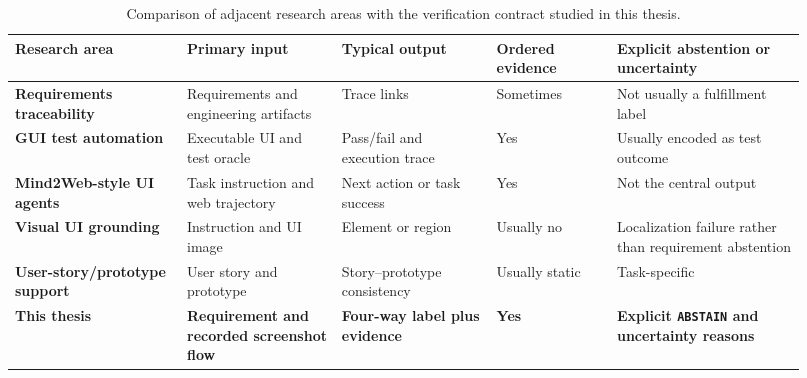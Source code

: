 \begin{table}[htbp]
  \centering
  \footnotesize
  \setlength{\tabcolsep}{4pt}
  \begin{tabular}{@{}>{\raggedright\arraybackslash}p{0.20\linewidth}>{\raggedright\arraybackslash}p{0.18\linewidth}>{\raggedright\arraybackslash}p{0.18\linewidth}>{\raggedright\arraybackslash}p{0.14\linewidth}>{\raggedright\arraybackslash}p{0.22\linewidth}@{}}
    \toprule
    \textbf{Research area} & \textbf{Primary input} & \textbf{Typical output} &
    \textbf{Ordered evidence} & \textbf{Explicit abstention or uncertainty} \\
    \midrule
    \textbf{Requirements traceability} & Requirements and engineering artifacts & Trace links & Sometimes & Not usually a fulfillment label \\
    \textbf{GUI test automation} & Executable UI and test oracle & Pass/fail and execution trace & Yes & Usually encoded as test outcome \\
    \textbf{Mind2Web-style UI agents} & Task instruction and web trajectory & Next action or task success & Yes & Not the central output \\
    \textbf{Visual UI grounding} & Instruction and UI image & Element or region & Usually no & Localization failure rather than requirement abstention \\
    \textbf{User-story/prototype support} & User story and prototype & Story--prototype consistency & Usually static & Task-specific \\
    \midrule
    \rowcolor{TUMLightGray!30}
    \textbf{This thesis} & \textbf{Requirement and recorded screenshot flow} &
    \textbf{Four-way label plus evidence} & \textbf{Yes} &
    \textbf{Explicit \texttt{ABSTAIN} and uncertainty reasons} \\
    \bottomrule
  \end{tabular}
  \caption{Comparison of adjacent research areas with the verification contract studied in this thesis.}
  \label{tab:research-gap-comparison}
\end{table}
